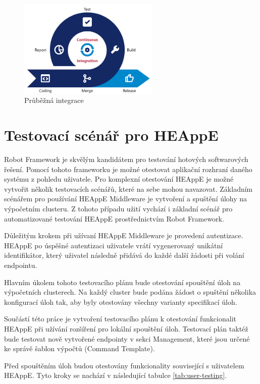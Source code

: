 \begin{figure}[h]
	\centering
	\includegraphics[width=0.6\textwidth]{Figures/cicd.png}
	\caption{Průběžná integrace \cite{cGNjWevJUlEHf7YF}}
	\label{fig:ci}
\end{figure}

\newpage
\section{Testovací scénář pro HEAppE}
Robot Framework je skvělým kandidátem pro testování hotových softwarových řešení. Pomocí tohoto frameworku je možné otestovat aplikační rozhraní daného systému z pohledu uživatele. Pro komplexní otestování HEAppE je možné vytvořit několik testovacích scénářů, které na sebe mohou navazovat. Základním scénářem pro používání HEAppE Middleware je vytvoření a spuštění úlohy na výpočetním clusteru. Z tohoto případu užití vychází i základní scénář pro automatizované testování HEAppE prostřednictvím Robot Framework.

Důležitým krokem při užívaní HEAppE Middleware je provedení autentizace. HEAppE po úspěšné autentizaci uživatele vrátí vygenerovaný unikátní identifikátor, který uživatel následně přidává do každé další žádosti při volání endpointu.

Hlavním úkolem tohoto testovacího plánu bude otestování spouštění úloh na výpočetních clusterech. Na každý cluster bude podána žádost o spuštění několika konfigurací úloh tak, aby byly otestovány všechny varianty specifikací úloh.

Součástí této práce je vytvoření testovacího plánu k otestování funkcionalit HEAppE při užívání rozšíření pro lokální spouštění úloh. Testovací plán taktéž bude testovat nově vytvořené endpointy v sekci Management, které jsou určené ke správě šablon výpočtů (Command Template).

\newpage
Před spouštěním úloh budou otestovány funkcionality související s uživatelem HEAppE. Tyto kroky se nachází v následující tabulce \ref{tab:user-testing}.

